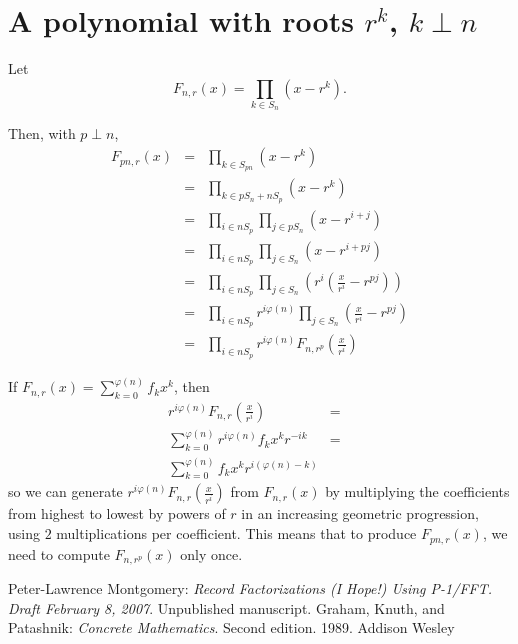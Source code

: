 \documentclass{article}
\begin{document}
\section{A polynomial with roots $r^k$, $k\perp n$}

Let
\begin{displaymath}
F_{n,r}(x) = \prod_{k \in S_n} (x-r^k).
\end{displaymath}

Then, with $p \perp n$,
\begin{eqnarray*}
F_{pn,r}(x) & = & \prod_{k \in S_{pn}} \left(x-r^k\right) \\
            & = & \prod_{k \in pS_n + nS_p} \left(x-r^k\right) \\
            & = & \prod_{i \in nS_p} \prod_{j \in pS_n} \left(x-r^{i+j}\right) \\
            & = & \prod_{i \in nS_p} \prod_{j \in S_n} \left(x-r^{i+pj}\right) \\
            & = & \prod_{i \in nS_p} \prod_{j \in S_n} \left(r^i \left(\frac{x}{r^i}-r^{pj}\right)\right) \\
            & = & \prod_{i \in nS_p} r^{i\varphi(n)} \prod_{j \in S_n} \left(\frac{x}{r^i}-r^{pj}\right) \\
            & = & \prod_{i \in nS_p} r^{i\varphi(n)} F_{n,r^p}\left(\frac{x}{r^i}\right)
\end{eqnarray*}

If $F_{n,r}(x) = \sum_{k=0}^{\varphi(n)} f_k x^k$, then 
\begin{eqnarray*}
r^{i\varphi(n)} F_{n,r}\left(\frac{x}{r^i}\right) & = &\\
\sum_{k=0}^{\varphi(n)} r^{i\varphi(n)} f_k x^k r^{-ik} & = & \\
\sum_{k=0}^{\varphi(n)} f_k x^k r^{i(\varphi(n)-k)} &&
\end{eqnarray*}
so we can generate $r^{i\varphi(n)} F_{n,r}\left(\frac{x}{r^i}\right)$ from 
$F_{n,r}(x)$ by multiplying the coefficients from highest to lowest by powers 
of $r$ in an increasing geometric progression, using $2$ multiplications 
per coefficient. This means that to produce $F_{pn,r}(x)$, we need to compute 
$F_{n,r^p}(x)$ only once.

\begin{thebibliography}{}
 Peter-Lawrence Montgomery: 
{\it Record Factorizations (I Hope!) Using P-1/FFT. Draft February 8, 2007}. 
Unpublished manuscript.
Graham, Knuth, and Patashnik: 
{\it Concrete Mathematics}. Second edition. 1989. Addison Wesley
\end{thebibliography}
\end{document}
